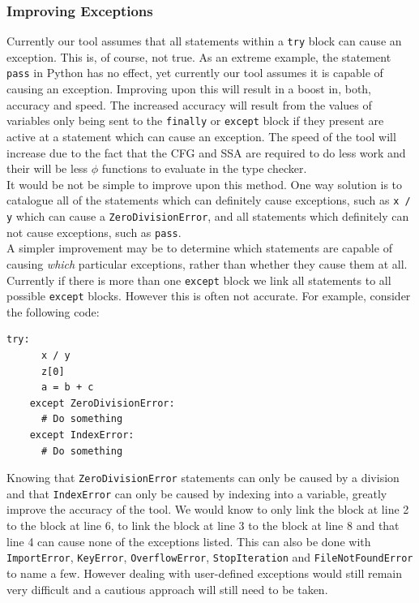 \documentclass[12pt, titlepage]{article}
\begin{document}
\subsubsection*{Improving Exceptions}
Currently our tool assumes that all statements within a \texttt{try} block can cause an exception. This is, of course, not true. As an extreme example, the statement \texttt{pass} in Python has no effect, yet currently our tool assumes it is capable of causing an exception. Improving upon this will result in a boost in, both, accuracy and speed. The increased accuracy will result from the values of variables only being sent to the \texttt{finally} or \texttt{except} block if they present are active at a statement which can cause an exception. The speed of the tool will increase due to the fact that the CFG and SSA are required to do less work and their will be less $\phi$ functions to evaluate in the type checker. \\
\indent It would be not be simple to improve upon this method. One way solution is to catalogue all of the statements which can definitely cause exceptions, such as \texttt{x / y} which can cause a \texttt{ZeroDivisionError}, and all statements which definitely can not cause exceptions, such as \texttt{pass}. \\
\indent A simpler improvement may be to determine which statements are capable of causing \textit{which} particular exceptions, rather than whether they cause them at all. Currently if there is more than one \texttt{except} block we link all statements to all possible \texttt{except} blocks. However this is often not accurate. For example, consider the following code:
\begin{lstlisting}[mathescape]
    try:
      x / y
      z[0]
      a = b + c
    except ZeroDivisionError:
      # Do something
    except IndexError:
      # Do something
\end{lstlisting}
Knowing that \texttt{ZeroDivisionError} statements can only be caused by a division and that \texttt{IndexError} can only be caused by indexing into a variable, greatly improve the accuracy of the tool. We would know to only link the block at line 2 to the block at line 6, to link the block at line 3 to the block at line 8 and that line 4 can cause none of the exceptions listed. This can also be done with \texttt{ImportError}, \texttt{KeyError}, \texttt{OverflowError}, \texttt{StopIteration} and \texttt{FileNotFoundError} to name a few. However dealing with user-defined exceptions would still remain very difficult and a cautious approach will still need to be taken.
\end{document}
